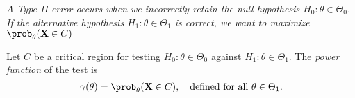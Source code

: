 \ben
\it A Type II error occurs when we incorrectly retain the null hypothesis $H_0:\theta\in\Theta_0$.
\it If the alternative hypothesis $H_1:\theta\in\Theta_1$ is correct, we want to maximize $\prob_{\theta}(\mathbf{X}\in C)$
\een

\begin{definition}
Let $C$ be a critical region for testing $H_0:\theta\in\Theta_0$ against $H_1:\theta\in\Theta_1$. The \emph{power function} of the test is
\[
\gamma(\theta) = \prob_{\theta}(\mathbf{X}\in C), \text{\quad defined for all $\theta\in\Theta_1$}.
\]
\end{definition}

%



